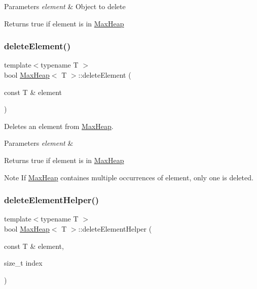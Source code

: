 \begin{DoxyParams}{Parameters}
{\em element} & Object to delete \\
\hline
\end{DoxyParams}
\begin{DoxyReturn}{Returns}
true if element is in \hyperlink{class_max_heap}{Max\+Heap} 
\end{DoxyReturn}
\mbox{\label{class_max_heap_a86b8d8285cf18a32544fe4777f9abbbb}} 
\subsubsection{\texorpdfstring{delete\+Element()}{deleteElement()}}
{\footnotesize\ttfamily template$<$typename T $>$ \\
bool \hyperlink{class_max_heap}{Max\+Heap}$<$ T $>$\+::delete\+Element (\begin{DoxyParamCaption}\item[{const T \&}]{element }\end{DoxyParamCaption})}



Deletes an element from \hyperlink{class_max_heap}{Max\+Heap}. 


\begin{DoxyParams}{Parameters}
{\em element} & \\
\hline
\end{DoxyParams}
\begin{DoxyReturn}{Returns}
true if element is in \hyperlink{class_max_heap}{Max\+Heap} 
\end{DoxyReturn}
\begin{DoxyNote}{Note}
If \hyperlink{class_max_heap}{Max\+Heap} containes multiple occurrences of element, only one is deleted. 
\end{DoxyNote}
\mbox{\label{class_max_heap_a26d90c2f692856397fa8e4e222b8c549}} 
\subsubsection{\texorpdfstring{delete\+Element\+Helper()}{deleteElementHelper()}}
{\footnotesize\ttfamily template$<$typename T $>$ \\
bool \hyperlink{class_max_heap}{Max\+Heap}$<$ T $>$\+::delete\+Element\+Helper (\begin{DoxyParamCaption}\item[{const T \&}]{element,  }\item[{size\+\_\+t}]{index }\end{DoxyParamCaption})\hspace{0.3cm}{\ttfamily [private]}}



